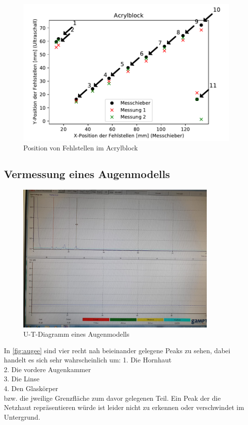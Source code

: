   \begin{figure}
    \centering
    \includegraphics{acrylblock.pdf}
    \caption{Position von Fehlstellen im Acrylblock}
    \label{fig:acrylblock}
  \end{figure}
  \pagebreak
  
  \subsection{Vermessung eines Augenmodells}
  \label{sec:auge}

  \begin{figure}[h]
    \label{fig:augee}
    \centering
    \includegraphics[width=10cm]{Auge}
    \caption{U-T-Diagramm eines Augenmodells}
\end{figure}
In \autoref{fig:augee} sind vier recht nah beieinander gelegene Peaks zu sehen, dabei handelt es sich sehr wahrscheinlich um:
 1. Die Hornhaut\\
 2. Die vordere Augenkammer\\
 3. Die Linse\\
 4. Den Glaskörper\\
 bzw. die jweilige Grenzfläche zum davor gelegenen Teil. Ein Peak der die Netzhaut repräsentieren würde ist leider nicht zu erkennen oder verschwindet 
 im Untergrund.   